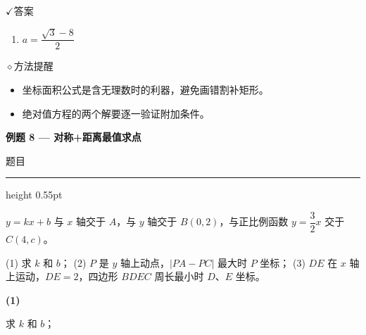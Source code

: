 \documentclass{exam-zh}
\newcommand{\eduSectionTitle}[1]{%
  \needspace{5\baselineskip}%
  \vspace{2mm}
  {\color{edu-blue}\bfseries\large #1}\par
  \vspace{3mm}
}
\newenvironment{eduSubQuestionItem}[1]{%
  \needspace{4\baselineskip}%
  \vspace{2mm}
  \par\noindent
  \hangindent=8mm\hangafter=1
  {\color{edu-blue}\bfseries #1}\enspace
  \begingroup
  \color{edu-ink}
}{%
  \endgroup
  \par
  \vspace{3mm}
}
\newcommand{\eduIconCheck}{\(\checkmark\)}
\newcommand{\eduIconPin}{\(\diamond\)}
\newenvironment{eduProblemBlock}[1][题目]{%
  \needspace{8\baselineskip}
  {\small\color{edu-muted}#1}\par
  \vspace{1.5mm}
  {\color{edu-blue}\hrule height 0.55pt}
  \vspace{4.5mm}
  \begingroup
  \color{edu-ink}
  \large
  \setlength{\parskip}{2.2mm}
  \linespread{1.20}\selectfont
}{%
  \par
  \endgroup
  \vspace{6mm}
}
\newenvironment{eduBulletList}{%
  \begin{itemize}[
    label=\textbullet,
    leftmargin=5mm,
    itemsep=1.2mm,
    topsep=0pt,
    parsep=0pt
  ]
}{%
  \end{itemize}
}
\newenvironment{eduBottomGrid}{%
  \vspace{1mm}
  \par\noindent
}{%
  \par\vspace{1mm}
}
\newenvironment{eduSummaryLeft}{%
  \begin{minipage}[t]{0.30\linewidth}
}{%
  \end{minipage}
}
\newcommand{\eduSummaryDivider}{%
  \hspace{4mm}{\color{edu-line}\vrule width 0.35pt}\hspace{7mm}%
}
\newenvironment{eduSummaryRight}{%
  \begin{minipage}[t]{0.58\linewidth}
}{%
  \end{minipage}
}
\newenvironment{eduPlainList}{%
  \begin{enumerate}[
    label=(\arabic*),
    leftmargin=7mm,
    itemsep=1.2mm,
    topsep=0pt,
    parsep=0pt
  ]
}{%
  \end{enumerate}
}
\begin{document}
\begin{eduBottomGrid}
  \begin{eduSummaryLeft}
    \begin{eduSummaryBlock}{\eduIconCheck}{答案}
    \begin{eduPlainList}
      \item $a = \dfrac{\sqrt{3}-8}{2}$    \end{eduPlainList}
    \end{eduSummaryBlock}
  \end{eduSummaryLeft}
  \eduSummaryDivider
  \begin{eduSummaryRight}
    \begin{eduSummaryBlock}{\eduIconPin}{方法提醒}
    \begin{eduBulletList}
      \item 坐标面积公式是含无理数时的利器，避免画错割补矩形。      \item 绝对值方程的两个解要逐一验证附加条件。    \end{eduBulletList}
    \end{eduSummaryBlock}
  \end{eduSummaryRight}
\end{eduBottomGrid}



\eduSectionTitle{例题 8 — 对称+距离最值求点}

\begin{eduProblemBlock}[题目]
$y=kx+b$ 与 $x$ 轴交于 $A$，与 $y$ 轴交于 $B(0,2)$，与正比例函数 $y=\dfrac{3}{2}x$ 交于 $C(4,c)$。

(1) 求 $k$ 和 $b$；
(2) $P$ 是 $y$ 轴上动点，$|PA-PC|$ 最大时 $P$ 坐标；
(3) $DE$ 在 $x$ 轴上运动，$DE=2$，四边形 $BDEC$ 周长最小时 $D$、$E$ 坐标。
\end{eduProblemBlock}









\begin{eduSubQuestionItem}{(1)}
求 $k$ 和 $b$；\end{eduSubQuestionItem}
\end{document}
